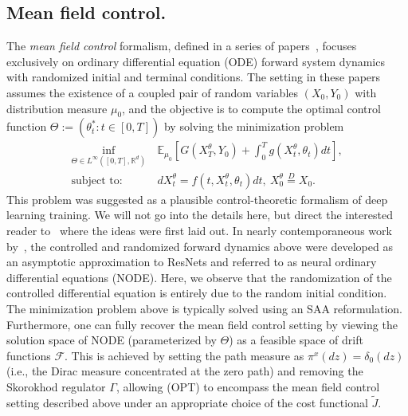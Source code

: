 \documentclass[11pt,leqno]{amsart}
\begin{document}
\subsection{Mean field control.} The {\it mean field control} formalism, defined in a series of papers~\citep{E1,E2,E3}, focuses exclusively on ordinary differential equation (ODE) forward system dynamics with randomized initial and terminal conditions. The setting in these papers assumes the existence of a coupled pair of random variables $(X_0,Y_0)$ with distribution measure $\mu_0$, and the objective is to compute the optimal control function $\Theta := (\theta^*_t: t \in [0,T])$ by solving the minimization problem
\begin{align*}
    \inf_{\Theta \in L^\infty([0,T],\mathbb R^d)} &~\mathbb E_{\mu_0} \left[ G(X^\theta_T,Y_0) + \int_0^T g(X^\theta_t,\theta_t) dt \right],\\
    \text{subject to:} &~dX_t^\theta = f(t,X_t^\theta,\theta_t) dt,~X^\theta_0 \stackrel{D}{=} X_0.
\end{align*}
This problem was suggested as a plausible control-theoretic formalism of deep learning training. We will not go into the details here, but direct the interested reader to~\cite{E1} where the ideas were first laid out. In nearly contemporaneous work by~\cite{chen2018neural}, the controlled and randomized forward dynamics above were developed as an asymptotic approximation to ResNets and referred to as neural ordinary differential equations (NODE). Here, we observe that the randomization of the controlled differential equation is entirely due to the random initial condition. The minimization problem above is typically solved using an SAA reformulation. Furthermore, one can fully recover the mean field control setting by viewing the solution space of NODE (parameterized by $\Theta$) as a feasible space of drift functions $\mathcal F$. This is achieved by setting the path measure as $\pi^x(dz) = \delta_0(dz)$ (i.e., the Dirac measure concentrated at the zero path) and removing the Skorokhod regulator $\Gamma$, allowing (OPT) to encompass the mean field control setting described above under an appropriate choice of the cost functional $\tilde J$. 
\end{document}
